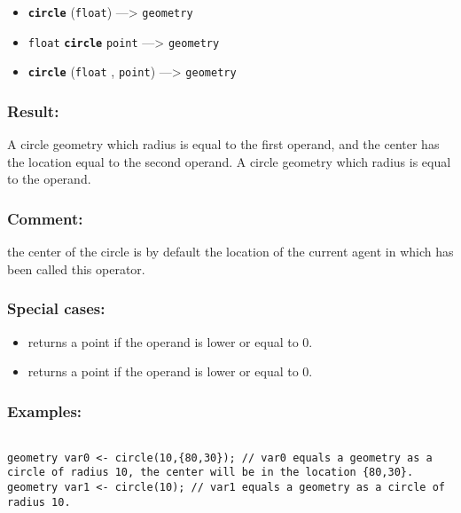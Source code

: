 \documentclass[]{book}
\providecommand{\tightlist}{%
  \setlength{\itemsep}{0pt}\setlength{\parskip}{0pt}}
\theoremstyle{definition}
\theoremstyle{definition}
\theoremstyle{definition}
\theoremstyle{remark}
\begin{document}
\begin{itemize}
\tightlist
\item
  \textbf{\texttt{circle}} (\texttt{float}) ---\textgreater{}
  \texttt{geometry}
\item
  \texttt{float} \textbf{\texttt{circle}} \texttt{point}
  ---\textgreater{} \texttt{geometry}
\item
  \textbf{\texttt{circle}} (\texttt{float} , \texttt{point})
  ---\textgreater{} \texttt{geometry}
\end{itemize}

\subsubsection{Result:}\label{result-83}

A circle geometry which radius is equal to the first operand, and the
center has the location equal to the second operand. A circle geometry
which radius is equal to the operand.

\subsubsection{Comment:}\label{comment-17}

the center of the circle is by default the location of the current agent
in which has been called this operator.

\subsubsection{Special cases:}\label{special-cases-28}

\begin{itemize}
\tightlist
\item
  returns a point if the operand is lower or equal to 0.\\
\item
  returns a point if the operand is lower or equal to 0.
\end{itemize}

\subsubsection{Examples:}\label{examples-64}

\begin{verbatim}
 
geometry var0 <- circle(10,{80,30}); // var0 equals a geometry as a circle of radius 10, the center will be in the location {80,30}. 
geometry var1 <- circle(10); // var1 equals a geometry as a circle of radius 10.
\end{verbatim}
\end{document}
